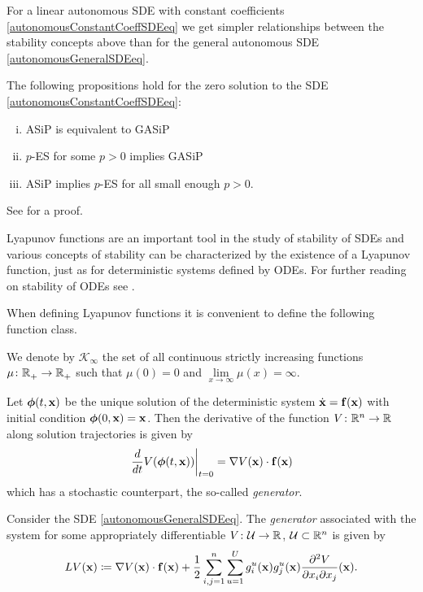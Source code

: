 \documentclass[a4paper,12pt,twoside,BCOR=10mm]{scrbook}
\begin{document}
For a linear autonomous SDE with constant coefficients \eqref{autonomousConstantCoeffSDEeq} we get simpler relationships between the stability concepts above than for the general autonomous SDE \eqref{autonomousGeneralSDEeq}.

\begin{theorem}
    The following propositions hold for the zero solution to the SDE \eqref{autonomousConstantCoeffSDEeq}:
    
    \begin{enumerate}[i)]
        \item ASiP is equivalent to GASiP
        \item $p$-ES for some $p>0$ implies GASiP
        \item ASiP implies $p$-ES for all small enough $p>0$.
    \end{enumerate}
\end{theorem}

See \citep{HGGS2018localLya} for a proof.

Lyapunov functions are an important tool in the study of stability of SDEs and various concepts of stability can be characterized by the existence of a Lyapunov function, just as for deterministic systems defined by ODEs. For further reading on stability of ODEs see \citep{Hahn1967, vidya2002, Khalil1992, sastry1999}.

When defining Lyapunov functions it is convenient to define the following function class.

\begin{definition}
    We denote by $\mathcal{K}_\infty$ the set of all continuous strictly increasing functions $\mu\colon \mathbb{R}^{}_+ \to \mathbb{R}^{}_+$ such that $\mu(0) = 0$ and $\lim\limits_{x \to \infty} \mu(x) = \infty$.
\end{definition}

Let $\bm{\phi}(t,\mathbf{x})$ be the unique solution of the deterministic system $\Dot{\mathbf{x}} = \mathbf{f}(\mathbf{x})$ with initial condition $\bm{\phi}(0, \mathbf{x}) = \mathbf{x}$. Then the derivative of the function $V \colon \mathbb{R}^{n} \to \mathbb{R}^{}$ along solution trajectories is given by
\begin{align*}
    \left. \frac{d}{dt}V(\bm{\phi}(t,\mathbf{x}))\right\rvert_{t = 0} = \nabla V(\mathbf{x})\cdot \mathbf{f}(\mathbf{x})
\end{align*}
which has a stochastic counterpart, the so-called \textit{generator}.

\begin{definition}
    Consider the SDE \eqref{autonomousGeneralSDEeq}. The \textit{generator} associated with the system for some appropriately differentiable $V \colon \mathcal{U} \to \mathbb{R}^{}$, $\mathcal{U} \subset \mathbb{R}^{n}$ is given by
    \begin{align}
        LV(\mathbf{x}) \coloneqq \nabla V(\mathbf{x})\cdot \mathbf{f}(\mathbf{x}) + \frac{1}{2}\sum\limits_{i,j = 1}^n\sum\limits_{u = 1}^U g_i^u(\mathbf{x}) g_j^u(\mathbf{x}) \frac{\partial^2 V}{\partial x_i \partial x_j}(\mathbf{x}).
    \end{align}
\end{definition}
\end{document}
